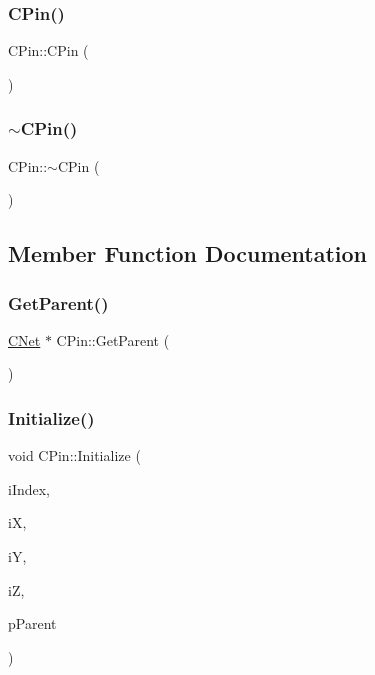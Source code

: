 \subsubsection{\texorpdfstring{CPin()}{CPin()}}
{\footnotesize\ttfamily C\+Pin\+::\+C\+Pin (\begin{DoxyParamCaption}{ }\end{DoxyParamCaption})}

\mbox{\label{classCPin_adfd0f2db0a4d35e2fa64a57a72cfcf13}} 
\subsubsection{\texorpdfstring{$\sim$CPin()}{~CPin()}}
{\footnotesize\ttfamily C\+Pin\+::$\sim$\+C\+Pin (\begin{DoxyParamCaption}{ }\end{DoxyParamCaption})\hspace{0.3cm}{\ttfamily [virtual]}}



\subsection{Member Function Documentation}
\mbox{\label{classCPin_a973360bb15e72845cc423efb6baaeed2}} 
\subsubsection{\texorpdfstring{GetParent()}{GetParent()}}
{\footnotesize\ttfamily \mbox{\hyperlink{classCNet}{C\+Net}} $\ast$ C\+Pin\+::\+Get\+Parent (\begin{DoxyParamCaption}{ }\end{DoxyParamCaption})}

\mbox{\label{classCPin_af52f7596a7edd0160763f881d0eb70c5}} 
\subsubsection{\texorpdfstring{Initialize()}{Initialize()}}
{\footnotesize\ttfamily void C\+Pin\+::\+Initialize (\begin{DoxyParamCaption}\item[{int}]{i\+Index,  }\item[{int}]{iX,  }\item[{int}]{iY,  }\item[{int}]{iZ,  }\item[{\mbox{\hyperlink{classCNet}{C\+Net}} $\ast$}]{p\+Parent }\end{DoxyParamCaption})\hspace{0.3cm}{\ttfamily [virtual]}}


